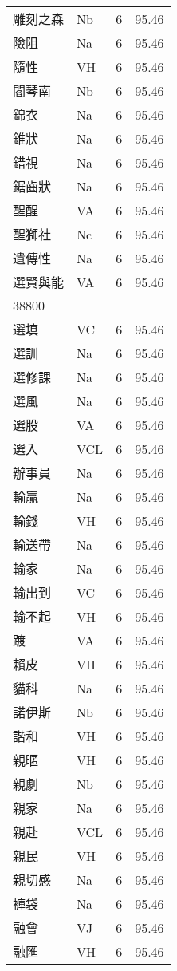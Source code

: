 \documentclass[twocolumn]{book}
\begin{document}
\begin{supertabular}{llrr}
雕刻之森 & Nb & 6 &  95.46\\
險阻 & Na & 6 &  95.46\\
隨性 & VH & 6 &  95.46\\
閻琴南 & Nb & 6 &  95.46\\
錦衣 & Na & 6 &  95.46\\
錐狀 & Na & 6 &  95.46\\
錯視 & Na & 6 &  95.46\\
鋸齒狀 & Na & 6 &  95.46\\
醒醒 & VA & 6 &  95.46\\
醒獅社 & Nc & 6 &  95.46\\
遺傳性 & Na & 6 &  95.46\\
選賢與能 & VA & 6 &  95.46\\
38800\\
選填 & VC & 6 &  95.46\\
選訓 & Na & 6 &  95.46\\
選修課 & Na & 6 &  95.46\\
選風 & Na & 6 &  95.46\\
選股 & VA & 6 &  95.46\\
選入 & VCL & 6 &  95.46\\
辦事員 & Na & 6 &  95.46\\
輸贏 & Na & 6 &  95.46\\
輸錢 & VH & 6 &  95.46\\
輸送帶 & Na & 6 &  95.46\\
輸家 & Na & 6 &  95.46\\
輸出到 & VC & 6 &  95.46\\
輸不起 & VH & 6 &  95.46\\
踱 & VA & 6 &  95.46\\
賴皮 & VH & 6 &  95.46\\
貓科 & Na & 6 &  95.46\\
諾伊斯 & Nb & 6 &  95.46\\
諧和 & VH & 6 &  95.46\\
親暱 & VH & 6 &  95.46\\
親劇 & Nb & 6 &  95.46\\
親家 & Na & 6 &  95.46\\
親赴 & VCL & 6 &  95.46\\
親民 & VH & 6 &  95.46\\
親切感 & Na & 6 &  95.46\\
褲袋 & Na & 6 &  95.46\\
融會 & VJ & 6 &  95.46\\
融匯 & VH & 6 &  95.46\\

\end{supertabular}
\end{document}
